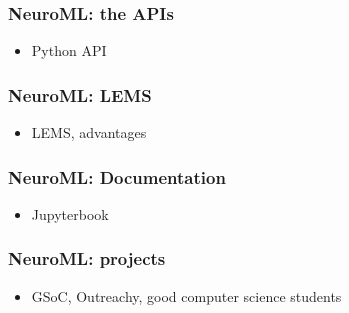 \begin{frame}[c]
  \frametitle{NeuroML: the APIs}
  \begin{itemize}
    \item Python API
  \end{itemize}
\end{frame}
\begin{frame}[c]
  \frametitle{NeuroML: LEMS}
  \begin{itemize}
    \item LEMS, advantages
  \end{itemize}
\end{frame}
\begin{frame}[c]
  \frametitle{NeuroML: Documentation}
  \begin{itemize}
    \item Jupyterbook
  \end{itemize}
\end{frame}
\begin{frame}[c]
  \frametitle{NeuroML: projects}
  \begin{itemize}
    \item GSoC, Outreachy, good computer science students
  \end{itemize}
\end{frame}

